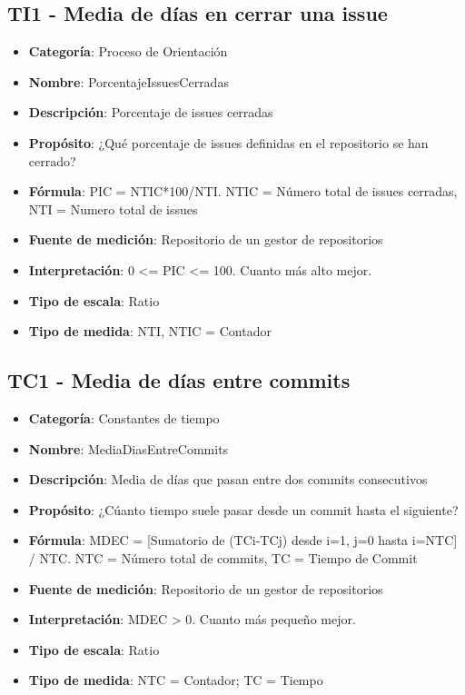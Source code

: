 \subsection{TI1 - Media de días en cerrar una issue}
\begin{itemize}
	\item \textbf{Categoría}: Proceso de Orientación
	\item \textbf{Nombre}: PorcentajeIssuesCerradas
	\item \textbf{Descripción}: Porcentaje de issues cerradas
	\item \textbf{Propósito}: ¿Qué porcentaje de issues definidas en el repositorio se han cerrado? 
	\item \textbf{Fórmula}: PIC = NTIC*100/NTI. NTIC = Número total de issues cerradas, NTI = Numero total de issues
	\item \textbf{Fuente de medición}: Repositorio de un gestor de repositorios
	\item \textbf{Interpretación}: 0 <= PIC <= 100. Cuanto más alto mejor.
	\item \textbf{Tipo de escala}: Ratio
	\item \textbf{Tipo de medida}: NTI, NTIC = Contador
\end{itemize}
\subsection{TC1 - Media de días entre commits}
\begin{itemize}
	\item \textbf{Categoría}: Constantes de tiempo
	\item \textbf{Nombre}: MediaDiasEntreCommits
	\item \textbf{Descripción}: Media de días que pasan entre dos commits consecutivos
	\item \textbf{Propósito}: ¿Cúanto tiempo suele pasar desde un commit hasta el siguiente?
	\item \textbf{Fórmula}: MDEC = [Sumatorio de (TCi-TCj) desde i=1, j=0 hasta i=NTC] / NTC. NTC = Número total de commits, TC = Tiempo de Commit 
	\item \textbf{Fuente de medición}: Repositorio de un gestor de repositorios
	\item \textbf{Interpretación}: MDEC > 0. Cuanto más pequeño mejor.
	\item \textbf{Tipo de escala}: Ratio
	\item \textbf{Tipo de medida}: NTC = Contador; TC = Tiempo
\end{itemize}
